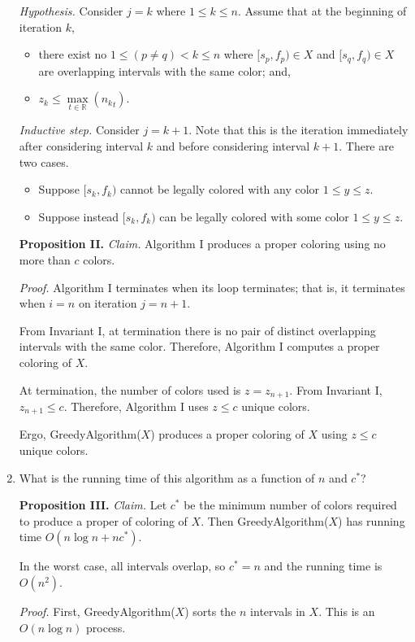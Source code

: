 \begin{enumerate}
\begin{solution}
\textit{Hypothesis. }Consider $j=k$ where $1\leq k\leq n$. Assume that at the beginning of iteration $k$,
\begin{itemize}
\item there exist no $1\leq (p\neq q)<k\leq n$ where $[s_p,f_p)\in X$ and $[s_q,f_q)\in X$ are overlapping intervals with the same color; and,
\item$z_k\leq\underset{t\in\mathbb{R}}{\max}({n_k}_t).$
\end{itemize}
\textit{Inductive step. }Consider $j=k+1$. Note that this is the iteration immediately after considering interval $k$ and before considering interval $k+1$. There are two cases.
\begin{itemize}
\item Suppose $[s_k,f_k)$ cannot be legally colored with any color $1\leq y\leq z$.
\item Suppose instead $[s_k,f_k)$ can be legally colored with some color $1\leq y\leq z$.
\end{itemize}
\textbf{Proposition II. }
\textit{Claim. }Algorithm I produces a proper coloring using no more than $c$ colors.

\textit{Proof. }Algorithm I terminates when its loop terminates; that is, it terminates when $i=n$ on iteration $j=n+1$.

From Invariant I, at termination there is no pair of distinct overlapping intervals with the same color. Therefore, Algorithm I computes a proper coloring of $X$.

At termination, the number of colors used is $z=z_{n+1}$. From Invariant I, $z_{n+1}\leq c$. Therefore, Algorithm I uses $z\leq c$ unique colors.

Ergo, {\sc GreedyAlgorithm}($X$) produces a proper coloring of $X$ using $z\leq c$ unique colors.
\end{solution}
\item What is the running time of this algorithm as a function of $n$ and $c^*$?
\begin{solution}
\textbf{Proposition III. }\textit{Claim. } Let $c^*$ be the minimum number of colors required to produce a proper of coloring of $X$. Then {\sc GreedyAlgorithm}($X$) has running time $O(n\log n+nc^*)$.

In the worst case, all intervals overlap, so $c^*=n$ and the running time is $O(n^2)$.

\textit{Proof. }First, {\sc GreedyAlgorithm}($X$) sorts the $n$ intervals in $X$. This is an $O(n\log n)$ process.


\end{solution}
\end{enumerate}
